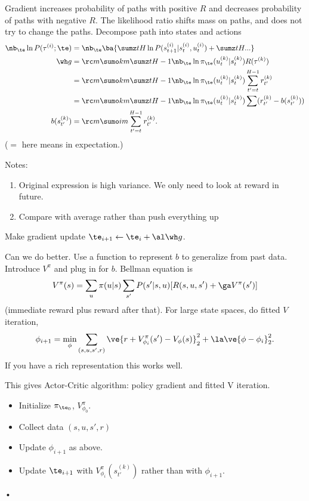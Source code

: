 Gradient increases probability of paths with positive $R$ and decreases probability of paths with negative $R$. The likelihood ratio shifts mass on paths, and does not try to change the paths.
Decompose path into states and actions
\begin{align}
\nb_\te \ln P(\tau^{(i)}; \te) &= \nb_\te\ba{\sumz tH \ln P(s_{t+1}^{(i)}|s_t^{(i)}, u_t^{(i)}) + \sumz tH ...}\\
\wh g&=\rc m \sumo km \sumz t{H-1} \nb_\te \ln \pi_\te(u_t^{(k)}|s_t^{(k)})R(\tau^{(k)})\\
&= \rc m \sumo km \sumz t{H-1} \nb_\te \ln \pi_\te(u_t^{(k)}|s_t^{(k)})\sum_{t'=t}^{H-1}r_{t'}^{(k)}\\
&=\rc m \sumo km \sumz t{H-1} \nb_\te \ln \pi_\te(u_t^{(k)}|s_t^{(k)})\sum(r_{t'}^{(k)}- b(s_{t'}^{(k)}))\\
b(s_{t'}^{(k)}) & = \rc m \sumo im \sum_{t'=t}^{H-1} r_{t'}^{(k)}.
\end{align}
($=$ here means in expectation.)

Notes:
\begin{enumerate}
\item
Original expression is high variance. We only need to look at reward in future.
\item
Compare with average rather than push everything up
\end{enumerate}
Make gradient update $\te_{i+1}\leftarrow \te_i + \al \wh g$.

Can we do better. Use a function to represent $b$ to generalize from past data. Introduce $V^\pi$ and plug in for $b$.
Bellman equation is
$$
V^\pi(s) = \sum_u \pi(u|s) \sum_{s'} P(s'|s,u) [R(s,u,s') + \ga V^\pi(s')]
$$
(immediate reward plus reward after that).
For large state spaces, do fitted $V$ iteration, 
$$
\phi_{i+1} =\min_\phi\sum_{(s,u,s',r)}\ve{r+V_{\phi_i}^\pi(s') - V_\phi(s)}_2^2 + \la \ve{\phi-\phi_i}_2^2.
$$
If you have a rich representation this works well.

This gives Actor-Critic algorithm: policy gradient and fitted V iteration.
\begin{itemize}
\item
Initialize $\pi_{\te_0}$, $V_{\phi_0}^\pi$.
\item
Collect data $(s,u,s',r)$
\item
Update $\phi_{i+1}$ as above. 
\item
Update $\te_{i+1}$ with $V_{\phi_i}^\pi(s_{t'}^{(k)})$ rather than with $\phi_{i+1}$. 
\end{itemize}•

